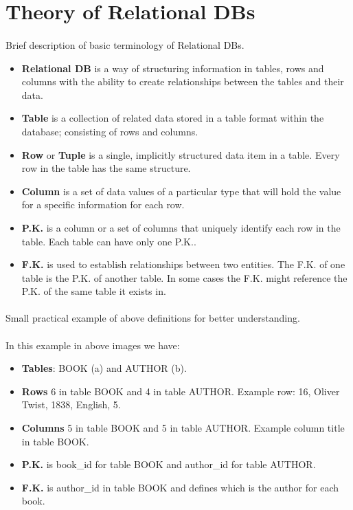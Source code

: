 
\section{Theory of Relational \aclp{DB}}
\paragraph{} Brief description of basic terminology of Relational \aclp{DB}.
\begin{itemize}
	\item \textbf{Relational \acs{DB}} is a way of structuring information in tables, rows and columns with the ability to create relationships between the tables and their data.
	\item \textbf{Table} is a collection of related data stored in a table format within the database; consisting of rows and columns.
	\item \textbf{Row} or \textbf{Tuple} is a single, implicitly structured data item in a table. Every row in the table has the same structure.
	\item \textbf{Column} is a set of data values of a particular type that will hold the value for a specific information for each row.
	\item \textbf{\acl{P.K.}} is a column or a set of columns that uniquely identify each row in the table. Each table can have only one \acl{P.K.}.
	\item \textbf{\acl {F.K.}} is used to establish relationships between two entities. The \acl {F.K.} of one table is the \acl{P.K.} of another table. In some cases the \acl {F.K.} might reference the \acl{P.K.} of the same table it exists in.
\end{itemize}
\paragraph{} Small practical example of above definitions for better understanding.
\begin{figure}[h]
	\centering
	\qquad
\end{figure}
\paragraph{} In this example in above images we have:
\begin{itemize}
	\item \textbf{Tables}: BOOK (a) and AUTHOR (b).
	\item \textbf{Rows} 6 in table BOOK and 4 in table AUTHOR. Example row: 16, Oliver Twist, 1838, English, 5.
	\item \textbf{Columns} 5 in table BOOK and 5 in table AUTHOR. Example column title in table BOOK.
	\item \textbf{\acl{P.K.}} is book\_id for table BOOK and author\_id for table AUTHOR.
	\item \textbf{\acl{F.K.}} is author\_id in table BOOK and defines which is the author for each book.
\end{itemize}

